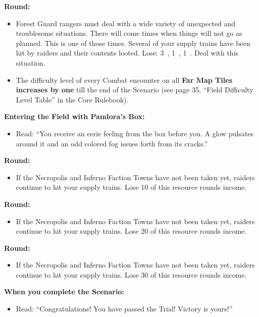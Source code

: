 \begin{multicols*}{2}
\textbf{ Round:}
\begin{itemize}
  \item Forest Guard rangers must deal with a wide variety of unexpected and troublesome situations.
    There will come times when things will not go as planned.
    This is one of those times.
    Several of your supply trains have been hit by raiders and their contents looted.
    Lose: 3~, 1~, 1~.
    Deal with this situation.
  \item The difficulty level of every Combat encounter on all \textbf{Far Map Tiles increases by one} till the end of the Scenario (see page 35, ``Field Difficulty Level Table'' in the Core Rulebook).
\end{itemize}

\textbf{Entering the Field with Pandora's Box:}
\begin{itemize}
  \item Read: ``You receive an eerie feeling from the box before you.
    A glow pulsates around it and an odd colored fog issues forth from its cracks.''
\end{itemize}

\textbf{ Round:}
\begin{itemize}
  \item If the Necropolis and Inferno Faction Towns have not been taken yet, raiders continue to hit your supply trains.
    Lose 10  of this resource rounds income.
\end{itemize}

\textbf{ Round:}
\begin{itemize}
  \item If the Necropolis and Inferno Faction Towns have not been taken yet, raiders continue to hit your supply trains.
    Lose 20  of this resource rounds income.
\end{itemize}

\textbf{ Round:}
\begin{itemize}
  \item If the Necropolis and Inferno Faction Towns have not been taken yet, raiders continue to hit your supply trains.
    Lose 30  of this resource rounds income.
\end{itemize}

\textbf{When you complete the Scenario:}
\begin{itemize}
  \item Read: ``Congratulations! You have passed the Trial! Victory is yours!''
\end{itemize}



\end{multicols*}
